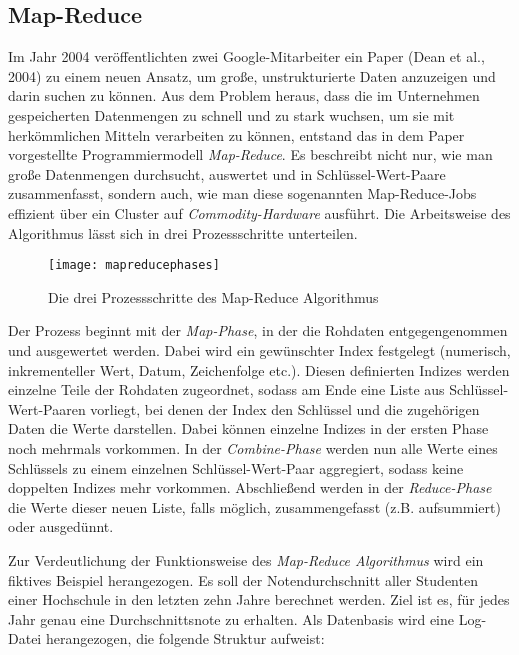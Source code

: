 \subsection{Map-Reduce}
\label{subsec:mapreduce}

Im Jahr 2004 veröffentlichten zwei Google-Mitarbeiter ein Paper (Dean et al., 2004) zu einem neuen Ansatz, um große, unstrukturierte Daten anzuzeigen und darin suchen zu können. Aus dem Problem heraus, dass die im Unternehmen gespeicherten Datenmengen zu schnell und zu stark wuchsen, um sie mit herkömmlichen Mitteln verarbeiten zu können, entstand das in dem Paper vorgestellte Programmiermodell \textit{Map-Reduce}. Es beschreibt nicht nur, wie man große Datenmengen durchsucht, auswertet und in Schlüssel-Wert-Paare zusammenfasst, sondern auch, wie man diese sogenannten Map-Reduce-Jobs effizient über ein Cluster auf \textit{Commodity-Hardware} ausführt. Die Arbeitsweise des Algorithmus lässt sich in drei Prozessschritte unterteilen.

\begin{figure}[!htb]
	\centering
	\texttt{[image: mapreducephases]}
	\caption{Die drei Prozessschritte des Map-Reduce Algorithmus}
	\label{img:mapreducephases}
\end{figure}

Der Prozess beginnt mit der \textit{Map-Phase}, in der die Rohdaten entgegengenommen und ausgewertet werden. Dabei wird ein gewünschter Index festgelegt (numerisch, inkrementeller Wert, Datum, Zeichenfolge etc.). Diesen definierten Indizes werden einzelne Teile der Rohdaten zugeordnet, sodass am Ende eine Liste aus Schlüssel-Wert-Paaren vorliegt, bei denen der Index den Schlüssel und die zugehörigen Daten die Werte darstellen. Dabei können einzelne Indizes in der ersten Phase noch mehrmals vorkommen. 
In der \textit{Combine-Phase} werden nun alle Werte eines Schlüssels zu einem einzelnen Schlüssel-Wert-Paar aggregiert, sodass keine doppelten Indizes mehr vorkommen.
Abschließend werden in der \textit{Reduce-Phase} die Werte dieser neuen Liste, falls möglich, zusammengefasst (z.B. aufsummiert) oder ausgedünnt. 

Zur Verdeutlichung der Funktionsweise des \textit{Map-Reduce Algorithmus} wird ein fiktives Beispiel herangezogen. Es soll der Notendurchschnitt aller Studenten einer Hochschule in den letzten zehn Jahre berechnet werden. Ziel ist es, für jedes Jahr genau eine Durchschnittsnote zu erhalten. Als Datenbasis wird eine Log-Datei herangezogen, die folgende Struktur aufweist:

